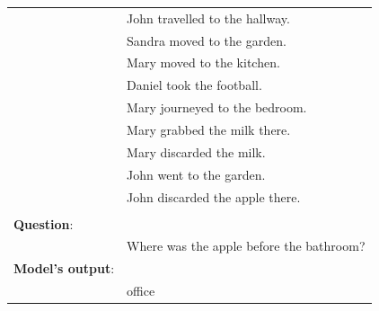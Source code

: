 \begin{figure}[!h]
\begin{minipage}{\textwidth}
\begin{tabular}{l l}
& John travelled to the hallway. \\
& Sandra moved to the garden. \\
& Mary moved to the kitchen. \\
& Daniel took the football. \\
& Mary journeyed to the bedroom. \\
& Mary grabbed the milk there. \\
& Mary discarded the milk. \\
& John went to the garden. \\
& John discarded the apple there. \\
\\
\textbf{Question}: & \\
& Where was the apple before the bathroom? \\
\textbf{Model's output}: & \\
& office
\end{tabular}
\end{minipage}
\end{figure}
